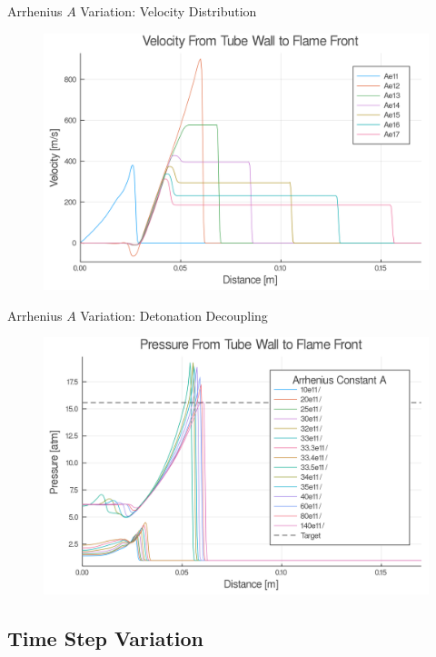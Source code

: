 \begin{frame}{Arrhenius $A$ Variation: Velocity Distribution}
\begin{figure}
\centering
\includegraphics[width=0.8\linewidth]{../figs/Atest/u.png}
\end{figure}
\end{frame}

\begin{frame}{Arrhenius $A$ Variation: Detonation Decoupling}
\begin{figure}
\centering
\includegraphics[width=0.8\linewidth]{../figs/Atest_refined/p_large.png}
\end{figure}
\end{frame}

\subsection{Time Step Variation}

